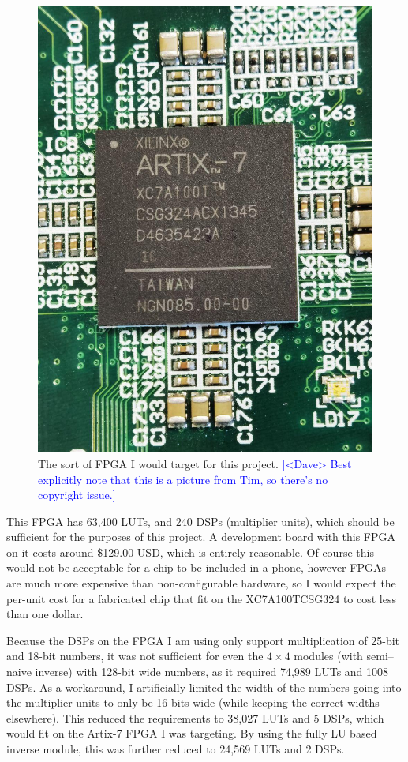 \documentclass[12pt]{article}
\newcommand{\note}[2][red]{\textcolor{#1}{#2}}
\newcommand{\notedme}[1]{\note[blue]{[<Dave> #1]}}
\begin{document}
\begin{figure}[thp]
	\centering
	
	\includegraphics[width=\textwidth]{tim_xilinx.jpg}
	
	\caption{The sort of FPGA I would target for this project. \notedme{Best explicitly note that this is a picture from Tim, so there's no copyright issue.} }
	\label{tim_xilinx}
\end{figure}

This FPGA has 63,400 LUTs, and 240 DSPs (multiplier units), which should be sufficient for the purposes of this project. A development board with this FPGA on it costs around \$129.00 USD, which is entirely reasonable. Of course this would not be acceptable for a chip to be included in a phone, however FPGAs are much more expensive than non-configurable hardware, so I would expect the per-unit cost for a fabricated chip that fit on the XC7A100TCSG324 to cost less than one dollar.

Because the DSPs on the FPGA I am using only support multiplication of 25-bit and 18-bit numbers, it was not sufficient for even the $4\times4$ modules (with semi--naive inverse) with 128-bit wide numbers, as it required 74,989 LUTs and 1008 DSPs. As a workaround, I artificially limited the width of the numbers going into the multiplier units to only be 16 bits wide (while keeping the correct widths elsewhere). This reduced the requirements to 38,027 LUTs and 5 DSPs, which would fit on the Artix-7 FPGA I was targeting. By using the fully LU based inverse module, this was further reduced to 24,569 LUTs and 2 DSPs.
\end{document}

